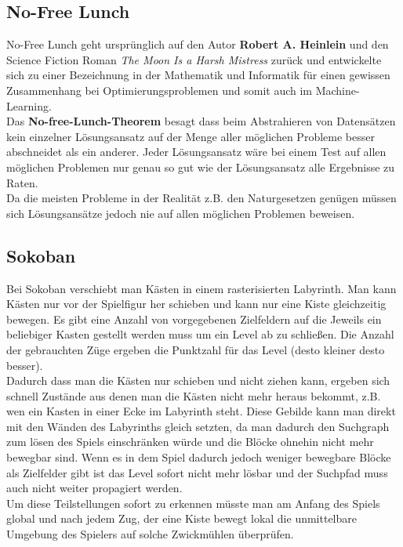 \documentclass[a4paper]{article}
\begin{document}
\subsection{No-Free Lunch}
No-Free Lunch geht ursprünglich auf den Autor \textbf{ Robert A. Heinlein} und den Science Fiction Roman \textit{The Moon Is a Harsh Mistress } zurück und entwickelte sich zu einer Bezeichnung in der Mathematik und Informatik für einen gewissen Zusammenhang bei Optimierungsproblemen und somit auch im Machine-Learning. \\
Das \textbf{No-free-Lunch-Theorem} besagt dass beim Abstrahieren von Datensätzen kein einzelner Lösungsansatz auf der Menge aller möglichen Probleme besser abschneidet als ein anderer. Jeder Lösungsansatz wäre bei einem Test auf allen möglichen Problemen nur genau so gut wie der Lösungsansatz alle Ergebnisse zu Raten.\\
Da die meisten Probleme in der Realität z.B. den Naturgesetzen genügen müssen sich Lösungsansätze jedoch nie auf allen möglichen Problemen beweisen.

\subsection{Sokoban}
Bei Sokoban verschiebt man Kästen in einem rasterisierten  Labyrinth. Man kann Kästen nur vor der Spielfigur her schieben und kann nur eine Kiste gleichzeitig bewegen. Es gibt eine Anzahl von vorgegebenen Zielfeldern auf die Jeweils ein beliebiger Kasten gestellt werden muss um ein Level ab zu schließen. Die Anzahl der gebrauchten Züge ergeben die Punktzahl für das Level (desto kleiner desto besser). \\
Dadurch dass man die Kästen nur schieben und nicht ziehen kann, ergeben sich schnell Zustände aus denen man die Kästen nicht mehr heraus bekommt, z.B. wen ein Kasten in einer Ecke im Labyrinth steht. Diese Gebilde kann man direkt mit den Wänden des Labyrinths gleich setzten, da man dadurch den Suchgraph zum lösen des Spiels einschränken würde und die Blöcke ohnehin nicht mehr bewegbar sind. Wenn es in dem Spiel dadurch jedoch weniger bewegbare Blöcke als Zielfelder gibt ist das Level sofort nicht mehr lösbar und der Suchpfad muss auch nicht weiter propagiert werden.\\
Um diese Teilstellungen sofort zu erkennen müsste man am Anfang des Spiels global und nach jedem Zug, der eine Kiste bewegt lokal die unmittelbare Umgebung des Spielers auf solche Zwickmühlen überprüfen. 
\end{document}
